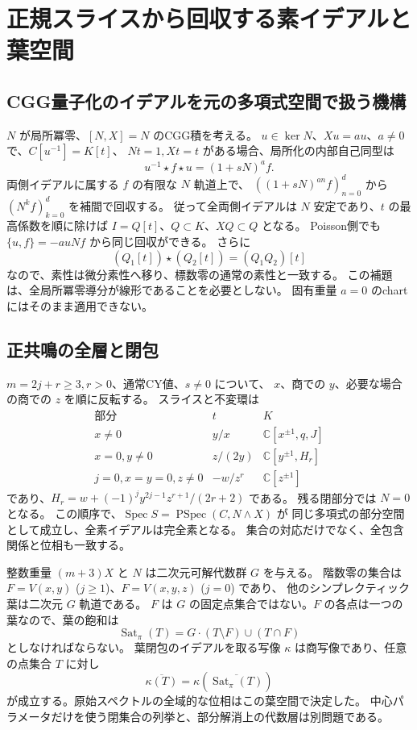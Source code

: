 \section{正規スライスから回収する素イデアルと葉空間}

\subsection{CGG量子化のイデアルを元の多項式空間で扱う機構}

$N$ が局所冪零、$[N,X]=N$ のCGG積を考える。
$u\in\ker N$、$Xu=au$、$a\ne0$ で、$C[u^{-1}]=K[t]$、
$Nt=1,Xt=t$ がある場合、局所化の内部自己同型は
\[
 u^{-1}\star f\star u=(1+sN)^a f.
\]
両側イデアルに属する $f$ の有限な $N$ 軌道上で、
$((1+sN)^{an}f)_{n=0}^{d}$ から $(N^kf)_{k=0}^{d}$ を補間で回収する。
従って全両側イデアルは $N$ 安定であり、$t$ の最高係数を順に除けば
$I=Q[t]$、$Q\subset K$、$XQ\subset Q$ となる。
Poisson側でも $\{u,f\}=-auNf$ から同じ回収ができる。
さらに
\[
 (Q_1[t])\star(Q_2[t])=(Q_1Q_2)[t]
\]
なので、素性は微分素性へ移り、標数零の通常の素性と一致する。
この補題は、全局所冪零導分が線形であることを必要としない。
固有重量 $a=0$ のchartにはそのまま適用できない。

\subsection{正共鳴の全層と閉包}

$m=2j+r\ge3,r>0$、通常CY値、$s\ne0$ について、
$x$、商での $y$、必要な場合の商での $z$ を順に反転する。
スライスと不変環は
\[
\begin{array}{c|c|c}
 \text{部分}&t&K\\\hline
 x\ne0&y/x&\mathbb C[x^{\pm1},q,J]\\
 x=0,y\ne0&z/(2y)&\mathbb C[y^{\pm1},H_r]\\
 j=0,x=y=0,z\ne0&-w/z^r&\mathbb C[z^{\pm1}]
\end{array}
\]
であり、$H_r=w+(-1)^j y^{2j-1}z^{r+1}/(2r+2)$ である。
残る閉部分では $N=0$ となる。
この順序で、$\operatorname{Spec}S=\operatorname{PSpec}(C,N\wedge X)$ が
同じ多項式の部分空間として成立し、全素イデアルは完全素となる。
集合の対応だけでなく、全包含関係と位相も一致する。

整数重量 $(m+3)X$ と $N$ は二次元可解代数群 $G$ を与える。
階数零の集合は $F=V(x,y)$ ($j\ge1$)、$F=V(x,y,z)$ ($j=0$) であり、
他のシンプレクティック葉は二次元 $G$ 軌道である。
$F$ は $G$ の固定点集合ではない。$F$ の各点は一つの葉なので、葉の飽和は
\[
 \operatorname{Sat}_\pi(T)=G\cdot(T\setminus F)\cup(T\cap F)
\]
としなければならない。
葉閉包のイデアルを取る写像 $\kappa$ は商写像であり、任意の点集合 $T$ に対し
\[
 \overline{\kappa(T)}=\kappa(\overline{\operatorname{Sat}_\pi(T)})
\]
が成立する。原始スペクトルの全域的な位相はこの葉空間で決定した。
中心パラメータだけを使う閉集合の列挙と、部分解消上の代数層は別問題である。

